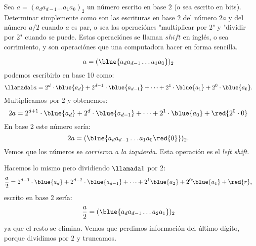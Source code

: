\begin{enunciado}{\ejercicio}
  Sea $a = (a_d a_{d-1} \ldots a_1 a_0)_2$ un número escrito en base $2$ (o sea escrito en bits). Determinar
  simplemente como son las escrituras en base $2$ del número $2a$ y del número $a/2$ cuando $a$ es par, o sea
  las operaciónes "multiplicar por 2" y "dividir por 2" cuando se puede. Estas operaciónes se llaman $shift$ en inglés,
  o sea corrimiento, y son operaciónes que una computadora hacer en forma sencilla.

\end{enunciado}

$$
  a = (\blue{a_d a_{d-1} \ldots a_1 a_0})_2
$$
podemos escribirlo en base 10 como:
$$
  \llamada1
  a = 2^d \cdot \blue{a_d} + 2^{d-1} \cdot \blue{a_{d-1}} + \cdots + 2^1 \cdot \blue{a_1} + 2^0 \cdot \blue{a_0}.
$$
Multiplicamos por $2$ y obtenemos:
$$
  2a = 2^{d + 1} \cdot \blue{a_d} + 2^d \cdot \blue{a_{d-1}} + \cdots + 2^1 \cdot \blue{a_0} + \red{2^0 \cdot 0}
$$
En base $2$ este número sería:
$$
  2a = (\blue{a_d a_{d-1} \ldots a_1 a_0 \red{0}})_2.
$$
Vemos que los números se \textit{corrieron a la izquierda}.
Esta operación es el \textit{left shift}.

\bigskip

Hacemos lo mismo pero dividiendo $\llamada1$ por 2:
$$
  \frac{a}{2} = 2^{d - 1} \cdot \blue{a_d} + 2^{d - 2} \cdot \blue{a_{d-1}} + \cdots + 2^1 \blue{a_2} + 2^0 \blue{a_1} + \red{r},
$$
escrito en base $2$ sería:
$$
  \frac{a}{2} = (\blue{a_{d} a_{d-1} \ldots a_2 a_1})_2
$$
ya que el resto se elimina. Vemos que perdimos información del último dígito, porque dividimos por 2 y truncamos.

\begin{aportes}
  \item {}
\end{aportes}

